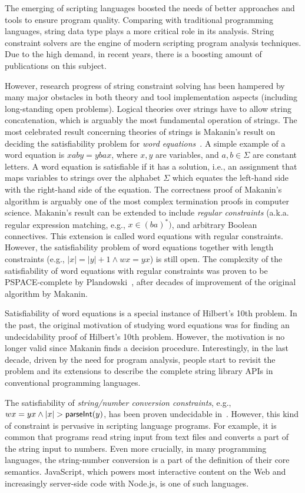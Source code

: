 
The emerging of scripting languages boosted the needs of better approaches and tools to ensure program quality.
Comparing with traditional programming languages, string data type plays a more critical role in its analysis.
String constraint solvers are the engine of modern scripting program analysis techniques. 
Due to the high demand, in recent years, there is a boosting amount of publications on this subject.

However, research progress of string constraint solving has been hampered by many major obstacles in both theory and tool implementation aspects (including long-standing open problems). 
Logical theories over strings have to allow string concatenation, which is arguably the most fundamental operation of strings. 
The most celebrated result concerning theories of strings is Makanin’s result on deciding the satisfiability problem for \emph{word equations}~\cite{makanin77}.
A simple example of a word equation is $xaby = ybax$, where $x, y$ are variables, and $a, b \in \Sigma$ are constant letters. 
A word equation is satisfiable if it has a solution, i.e., an assignment that maps variables to strings over the alphabet $\Sigma$ which equates the left-hand side with the right-hand side of the equation.
The correctness proof of Makanin’s algorithm is arguably one of the most complex termination proofs in computer science. 
Makanin’s result can be extended to include \emph{regular constraints} (a.k.a. regular expression matching, e.g., $x \in (ba)^*)$, and arbitrary Boolean connectives.
This extension is called word equations with regular constraints. 
However, the satisfiability problem of word equations together with length constraints (e.g., $|x|=|y|+1 \wedge wx=yx$) is still open.
The complexity of the satisfiability of word equations with regular constraints was proven to be PSPACE-complete by Plandowski~\cite{plandowski99}, after decades of improvement of the original algorithm by Makanin.

Satisfiability of word equations is a special instance of Hilbert’s 10th problem. 
In the past, the original motivation of studying word equations was for finding an undecidability proof of Hilbert’s 10th problem. 
However, the motivation is no longer valid since Makanin finds a decision procedure. Interestingly, in the last decade, driven by the need for program analysis, people start to revisit the problem and its extensions to describe the complete string library APIs in conventional programming languages.

The satisfiability of \emph{string/number conversion constraints}, e.g., $wx=yx \wedge |x| > \textsf{parseInt}(y)$, has been proven undecidable in~\cite{DayGHMN18}. 
However, this kind of constraint is pervasive in scripting language programs. 
For example, it is common that programs read string input from text files and converts a part of the string input to numbers.
Even more crucially, in many programming languages, the string-number conversion is a part of the definition of their core semantics. 
JavaScript, which powers most interactive content on the Web and increasingly server-side code with Node.js, is one of such languages. 

